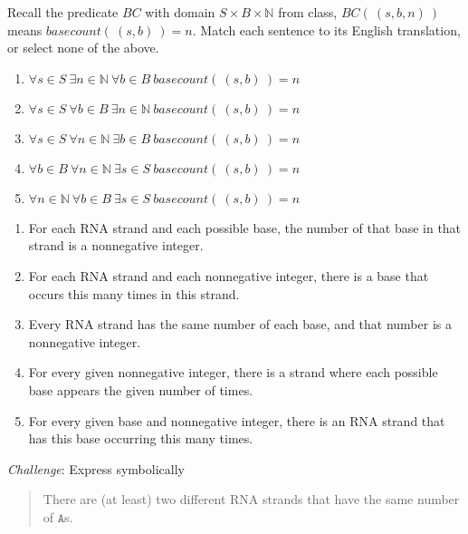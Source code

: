 \documentclass[12pt, oneside]{article}
\newcommand{\A}[0]{\texttt{A}}
\begin{document}
\begin{enumerate}
\begin{enumerate}
Recall the predicate $BC$ with domain $S \times B \times \mathbb{N}$ from class,
$BC(~(s,b,n)~)$ means $basecount(~(s,b)~) = n$.
Match each sentence to its English translation, or select none of the above.
\begin{enumerate}
\item $\forall s \in S ~\exists n \in \mathbb{N} ~\forall b \in B ~basecount(~(s,b)~) = n$
\item $\forall s \in S ~\forall b \in B ~\exists n \in \mathbb{N} ~basecount(~(s,b)~) = n$
\item $\forall s \in S ~\forall n \in \mathbb{N} ~\exists b \in B ~basecount(~(s,b)~) = n$
\item $\forall b \in B ~\forall n \in \mathbb{N} ~\exists s \in S ~basecount(~(s,b)~) = n$
\item $\forall n \in \mathbb{N} ~\forall b \in B ~\exists s \in S ~basecount(~(s,b)~) = n$
\end{enumerate}

\begin{enumerate}[label=\roman*.]
    \item For each RNA strand and each possible base, the number of that base in that strand is a nonnegative integer.
    \item For each RNA strand and each nonnegative integer, there is a base that occurs this many times in this strand.
    \item Every RNA strand has the same number of each base, and that number is a nonnegative integer.
    \item For every given nonnegative integer, there is a strand where each possible base appears the given number of times.
    \item For every given base and nonnegative integer, there is an RNA strand that has this base occurring this many times.
\end{enumerate}


{\it Challenge}: Express symbolically

\begin{quote}
    There are (at least) two different RNA strands that have the same number of $\A$s.
\end{quote}     \end{enumerate}
\end{enumerate}
\end{document}
